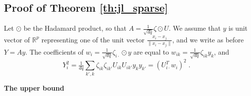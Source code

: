 \documentclass{ps}
\def\R{\mathbb{R}}
\newcommand{\1}{\mathbbm{1}}
\theoremstyle{plain}
\begin{document}
\subsection{Proof of Theorem \ref{th:jl_sparse}}
	
Let $\odot$ be the Hadamard product, so that $A = \tfrac{1}{\sqrt{dq}}\zeta \odot U$. We assume that $y$ is unit vector of $\R^p$ representing one of the unit vector $\tfrac{x_i - x_j}{\|x_i - x_j\|}$, and we write as before $Y = Ay$. The coefficients of $w_i = \tfrac{1}{\sqrt{dq}}\zeta_{i\cdot} \odot y$ are equal to $w_{ik} = \tfrac{1}{\sqrt{dq}}\zeta_{ik}y_k$, and
\begin{equation*}
    Y_i^2 = \tfrac{1}{dq}\sum_{k',k}\zeta_{ik}\zeta_{ik'}U_{ik}U_{ik'}y_ky_{k'} =  (U_{i\cdot}^T w_i)^2\; .
\end{equation*}


\medskip

\noindent
{\bf The upper bound}

\medskip
\end{document}
